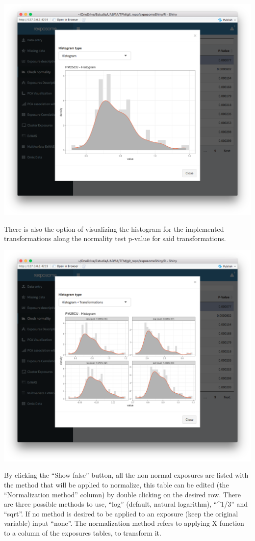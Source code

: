 \documentclass[
]{book}
\begin{document}
\includegraphics{images/analysis3_2.png}

There is also the option of visualizing the histogram for the implemented transformations along the normality test p-value for said transformations.

\includegraphics{images/analysis3_2_2.png}

By clicking the ``Show false'' button, all the non normal exposures are listed with the method that will be applied to normalize, this table can be edited (the ``Normalization method'' column) by double clicking on the desired row. There are three possible methods to use, ``log'' (default, natural logarithm), ``\^{}1/3'' and ``sqrt''. If no method is desired to be applied to an exposure (keep the original variable) input ``none''. The normalization method refers to applying X function to a column of the exposures tables, to transform it.
\end{document}
